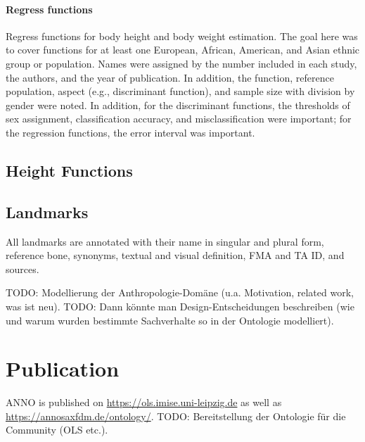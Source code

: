 \documentclass[sw]{iosart2x}
\begin{document}
\paragraph{Regress functions}
Regress functions for body height and body weight estimation. The goal here was to cover functions for at least one European, African, American, and Asian ethnic group or population. Names were assigned by the number included in each study, the authors, and the year of publication. In addition, the function, reference population, aspect (e.g., discriminant function), and sample size with division by gender were noted. In addition, for the discriminant functions, the thresholds of sex assignment, classification accuracy, and misclassification were important; for the regression functions, the error interval was important.

\subsection{Height Functions}
\subsection{Landmarks}
All landmarks are annotated with their name in singular and plural form, reference bone, synonyms, textual and visual definition, FMA and TA ID, and sources.

TODO: Modellierung der Anthropologie-Domäne (u.a. Motivation, related work, was ist neu).
TODO: Dann könnte man Design-Entscheidungen beschreiben (wie und warum wurden bestimmte Sachverhalte so in der Ontologie modelliert).
\section{Publication}
ANNO is published on \url{https://ols.imise.uni-leipzig.de} as well as \url{https://annosaxfdm.de/ontology/}.
TODO: Bereitstellung der Ontologie für die Community (OLS etc.). 
\end{document}
